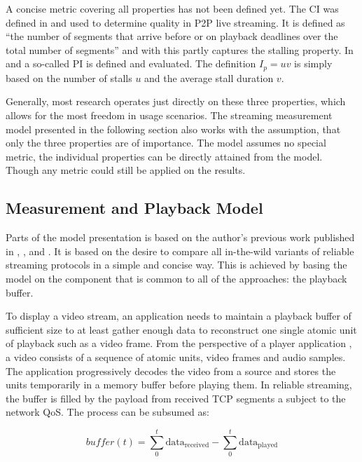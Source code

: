 A concise metric covering all properties has not been defined yet. The \gls{CI} was defined in \cite{1498486} and used to determine quality in \gls{P2P} live streaming. It is defined as \enquote{the number of segments that arrive before or on playback deadlines over the total number of segments} and with this partly captures the stalling property. In \cite{5634160} and \cite{DBLP:journals/corr/SeyedebrahimiBP13} a so-called \gls{PI} is defined and evaluated. The definition $I_p = uv$ is simply based on the number of stalls $u$ and the average stall duration $v$. 

Generally, most research operates just directly on these three properties, which allows for the most freedom in usage scenarios. The streaming measurement model presented in the following section also works with the assumption, that only the three properties are of importance. The model assumes no special metric, the individual properties can be directly attained from the model. Though any metric could still be applied on the results.


\subsection{Measurement and Playback Model}
\label{c3:model}

Parts of the model presentation is based on the author's previous work published in \cite{cs3518}, \cite{metzger2011delivery}, and \cite{6229739}. It is based on the desire to compare all in-the-wild variants of reliable streaming protocols in a simple and concise way. This is achieved by basing the model on the component that is common to all of the approaches: the playback buffer.

To display a video stream, an application needs to maintain a playback buffer of sufficient size to at least gather enough data to reconstruct one single atomic unit of playback such as a video frame.
From the perspective of a player application , a video consists of a sequence of atomic units, video frames and audio samples.
The application progressively decodes the video from a source and stores the units temporarily in a memory buffer before playing them. In reliable streaming, the buffer is filled by the payload from received \gls{TCP} segments a subject to the network \gls{QoS}. The process can be subsumed as:

\begin{equation*}
\mathit{buffer}(t) = \sum_{0}^{t} \text{data}_\mathrm{received} - \sum_{0}^{t} \text{data}_\mathrm{played}
\end{equation*}

